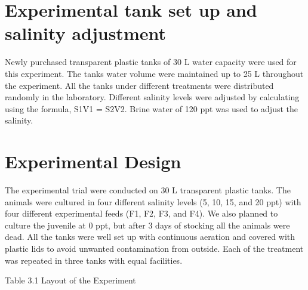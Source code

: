\documentclass[
]{book}
\begin{document}
\hypertarget{experimental-tank-set-up-and-salinity-adjustment}{%
\section{Experimental tank set up and salinity adjustment}\label{experimental-tank-set-up-and-salinity-adjustment}}

Newly purchased transparent plastic tanks of 30 L water capacity were used for this experiment. The tanks water volume were maintained up to 25 L throughout the experiment. All the tanks under different treatments were distributed randomly in the laboratory. Different salinity levels were adjusted by calculating using the formula, S1V1 = S2V2. Brine water of 120 ppt was used to adjust the salinity.

\hypertarget{experimental-design}{%
\section{Experimental Design}\label{experimental-design}}

The experimental trial were conducted on 30 L transparent plastic tanks. The animals were cultured in four different salinity levels (5, 10, 15, and 20 ppt) with four different experimental feeds (F1, F2, F3, and F4). We also planned to culture the juvenile at 0 ppt, but after 3 days of stocking all the animals were dead. All the tanks were well set up with continuous aeration and covered with plastic lids to avoid unwanted contamination from outside. Each of the treatment was repeated in three tanks with equal facilities.

Table 3.1 Layout of the Experiment
\end{document}
